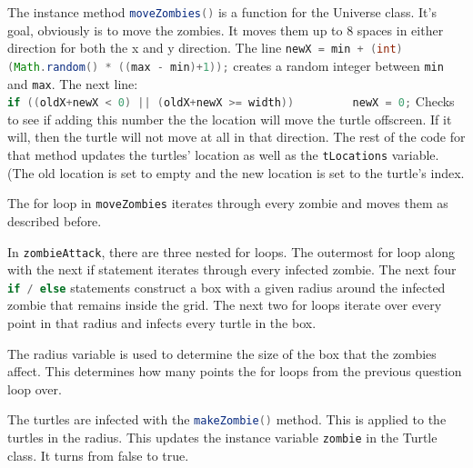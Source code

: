\documentclass[12pt]{article}
\newcommand{\lstJava}[1]{\lstinline[language=Java,breaklines=true,basicstyle= \listingsfontinline]$#1$}
\newenvironment{question}[2][Question]{\begin{trivlist}
\item[\hskip \labelsep {\bfseries #1}\hskip \labelsep {\bfseries #2.}]}{\end{trivlist}}
\begin{document}
\begin{question}{4}
	The instance method \lstJava{moveZombies()} is a function for the Universe class. It's goal, obviously is
	to move the zombies. It moves them up to 8 spaces in either direction for both the x and y direction. The
	line \lstJava{newX = min + (int)(Math.random() * ((max - min)+1));} creates a random integer between 
	\lstJava{min} and \lstJava{max}. The next line:\\ 
	\lstJava{if ((oldX+newX < 0) || (oldX+newX >= width))
		newX = 0;}
	Checks to see if adding this number the the location will move the turtle offscreen. If it will, then 
	the turtle will not move at all in that direction. The rest of the code for that method updates the
       	turtles' location as well as the \lstJava{tLocations} variable. (The old location is set to empty
	and the new location is set to the turtle's index.
	
\end{question}

\begin{question}{5}
	The for loop in \lstJava{moveZombies} iterates through every zombie and moves them as described before.
	
\end{question}

\begin{question}{6}
	In \lstJava{zombieAttack}, there are three nested for loops. The outermost for loop along with the next 
	if statement iterates through every infected zombie. The next four \lstJava{if / else} statements 
	construct a box with a given radius around the infected zombie that remains inside the grid. The next 
	two for loops iterate over every point in that radius and infects every turtle in the box.

\end{question}

\begin{question}{7}
	The radius variable is used to determine the size of the box that the zombies affect. This determines 
	how many points the for loops from the previous question loop over.
	
\end{question}

\begin{question}{8}
	The turtles are infected with the \lstJava{makeZombie()} method. This is applied to the turtles in the 
	radius. This updates the instance variable \lstJava{zombie} in the Turtle class. It turns from false to 
	true.
	
\end{question}
\end{document}
